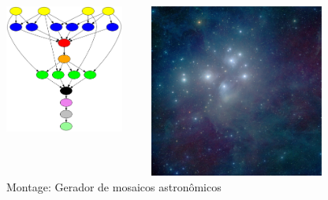 \documentclass{beamer}
\begin{document}
\begin{frame}
\frametitle{}

\begin{figure}[htp]

\begin{columns}
	\begin{column}{0.5\textwidth}	
	\begin{center}
	  \includegraphics[width=0.9\textwidth]{Montage_PP.png}
	  \caption[map]{Montage: Gerador de mosaicos astronômicos}
	\end{center}
	\end{column}
	\begin{column}{0.5\textwidth}	
	\begin{center}
	  \includegraphics[width=0.9\textwidth]{Mosaico.jpg}

\end{center}
\end{column}
\end{columns}
\end{figure}
\end{frame}
\end{document}
